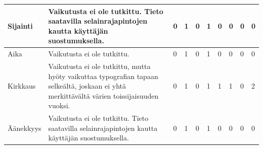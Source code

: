 \documentclass[finnish, 12pt, a4paper, elec, utf8, a-1b, online]{aaltothesis}
\begin{document}
{\begin{longtable}{p{2.5cm}|p{6cm}|p{0.5cm}p{0.5cm}p{0.5cm}|p{0.5cm}|p{0.5cm}p{0.5cm}p{0.5cm}|p{0.5cm}|}
    \midrule
    Sijainti                               & Vaikutusta ei ole tutkittu. Tieto saatavilla selainrajapintojen kautta käyttäjän suostumuksella.                                                                                                                                                                                                                     & 0                                          & 1                                   & 0                                      & 1                            & 0                                               & 0                                         & 0                                         & 0                            \\
    \midrule
    Aika                                   & Vaikutusta ei ole tutkittu.                                                                                                                                                                                                                                                                                          & 0                                          & 1                                   & 0                                      & 1                            & 0                                               & 0                                         & 0                                         & 0                            \\
    \midrule
    Kirkkaus                               & Vaikutusta ei ole tutkittu, mutta hyöty vaikuttaa typografian tapaan selkeältä, joskaan ei yhtä merkittävältä värien toissijaisuuden vuoksi.                                                                                                                                                                         & 0                                          & 1                                   & 0                                      & 1                            & 1                                               & 1                                         & 0                                         & 2                            \\
    \midrule
    Äänekkyys                              & Vaikutusta ei ole tutkittu. Tieto saatavilla selainrajapintojen kautta käyttäjän suostumuksella.                                                                                                                                                                                                                     & 0                                          & 1                                   & 0                                      & 1                            & 0                                               & 0                                         & 0                                         & 0                            \\

\end{longtable}}
\end{document}
